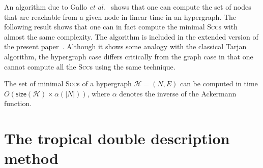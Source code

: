 \documentclass[proceedings]{stacs}
\newcommand{\HH}{\mathcal{H}}
\newcommand{\size}{\mathsf{size}}
\newcommand{\card}[1]{\left\lvert #1 \right\rvert}
\newcommand{\etal}{\textit{et al.}}
\newcommand{\scc}{\textsc{Scc}}
\begin{document}
An algorithm due to Gallo \etal{}~\cite{GalloDAM93} shows that one can compute the set of nodes that are reachable from a given node in linear time in an hypergraph. 
The following result shows that one can in fact compute
the minimal \scc{}s  with almost the same complexity.
The algorithm is included in the extended version of the present paper~\cite{AGG09}.
Although it shows
some analogy with the classical Tarjan algorithm, 
the hypergraph case differs critically from the graph case
in that one cannot compute all the \scc{}s using the same technique.

\begin{theorem}\label{th-hyper}
The set of minimal \scc{}s of a hypergraph $\HH = (N,E)$
can be computed in time $O(\size(\HH) \times \alpha(\card{N}))$, where
$\alpha$ denotes the inverse of the Ackermann function.
\end{theorem}


\section{The tropical double description method}\label{sec:ddm}
\end{document}
